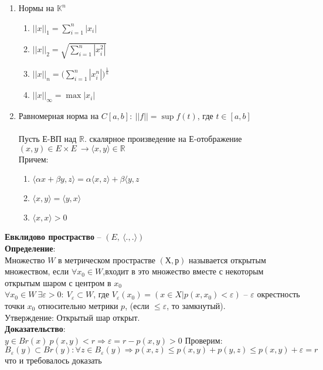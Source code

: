 	\begin{enumerate}
		\item 
		Нормы на $\mathbb{K}^n$
		\begin{enumerate}
			\item ${||x||}_1 = \sum_{i = 1}^n |x_i|$
			\item ${||x||}_2 = \sqrt{\sum_{i = 1}^n |x_i^2|}$
			\item ${||x||}_n = \Bigg(\sum_{i = 1}^n |x_i^n|\Bigg)^{\frac{1}{n}}$
			\item ${||x||}_{\infty} = \max{|x_i|}$
		\end{enumerate}
		
		\item 
		Равномерная норма на $C[a,b]:\ ||f|| = \sup{f(t)}$, где $t \in [a,b]$\\
		\\
		Пусть Е-ВП над $\mathbb{R}$. скалярное произведение на Е-отображение $(x,y) \in E\times E\ \rightarrow \langle{x,y}\rangle \in \mathbb{R}$ \\
		Причем:
		\begin{enumerate}
			\item $\langle{\alpha x+ \beta y,z}\rangle=\alpha \langle{x,z} \rangle+\beta \langle{y,z}$
			\item $\langle{x,y} \rangle=\langle{y,x} \rangle$
			\item $\langle{x,x} \rangle >0$
		\end{enumerate}
	\end{enumerate}
	\textbf{Евклидово простраство} -- $(E,\ \langle{.,.}\rangle)$\\
	\textbf{Определение}:\\
	Множество $W$ в метрическом прострастве $(Х,р)$ называется открытым множеством, если $\forall x_0 \in W$,входит в это множество вместе с некоторым открытым шаром с центром в $x_0$\\
	$\forall x_0 \in W\ \exists\varepsilon > 0:\ V_{\varepsilon}\subset W$, где $V_{\varepsilon}(x_0) = (x \in X | p(x,x_0) < \varepsilon )$ -- $\varepsilon$ окрестность точки $x_0$ относительно метрики $p$, (если $\leqslant \varepsilon$, то замкнутый).\\
	Утверждение: Открытый шар открыт.\\
	\textbf{Доказательство}:\\
	$y \in Br(x)\ p(x,y)< r \Rightarrow \varepsilon=r - p(x,y)>0$ Проверим:\\
	$B_{\varepsilon}(y) \subset Br(y): \forall z \in B_{\varepsilon}(y) \Rightarrow p(x,z)\leqslant p(x,y) + p(y,z)\leqslant p(x,y)+\varepsilon= r$ что и требовалось доказать
	
